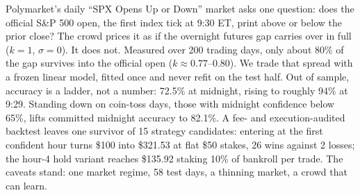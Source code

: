 Polymarket's daily ``SPX Opens Up or Down'' market asks one question: does the
official S\&P 500 open, the first index tick at 9:30 ET, print above or
below the prior close? The crowd prices it as if the overnight futures gap
carries over in full ($k=1$, $\sigma=0$). It does not. Measured over 200
trading days, only about 80\% of the gap survives into the official open
($k \approx 0.77$--$0.80$). We trade that spread with a frozen linear model,
fitted once and never refit on the test half. Out of sample, accuracy is a
ladder, not a number: 72.5\% at midnight, rising to roughly 94\% at 9:29.
Standing down on coin-toss days, those with midnight confidence below 65\%,
lifts committed midnight accuracy to 82.1\%. A fee- and execution-audited
backtest leaves one survivor of 15 strategy candidates: entering at the first
confident hour turns \$100 into \$321.53 at flat \$50 stakes, 26 wins against
2 losses; the hour-4 hold variant reaches \$135.92 staking 10\% of bankroll
per trade. The caveats stand: one market regime, 58 test days, a thinning
market, a crowd that can learn.
